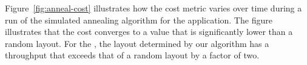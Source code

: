 Figure~\ref{fig:anneal-cost} illustrates how the cost metric varies
over time during a run of the simulated annealing algorithm for the
\BeamFormer application.  The figure illustrates that the cost
converges to a value that is significantly lower than a random layout.
For the \BeamFormer, the layout determined by our algorithm has a
throughput that exceeds that of a random layout by a factor of two.

